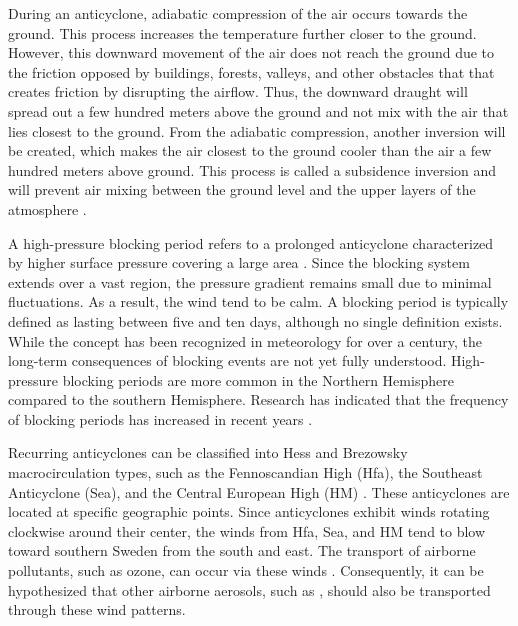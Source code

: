 During an anticyclone, adiabatic compression of the air occurs towards the ground. This process increases the temperature further closer to the ground. However, this downward movement of the air does not reach the ground due to the friction opposed by buildings, forests, valleys, and other obstacles that that creates friction by disrupting the airflow. Thus, the downward draught will spread out a few hundred meters above the ground and not mix with the air that lies closest to the ground. From the adiabatic compression, another inversion will be created, which makes the air closest to the ground cooler than the air a few hundred meters above ground. This process is called a subsidence inversion and will prevent air mixing between the ground level and the upper layers of the atmosphere \cite{gramschInfluenceSurfaceSubsidence2014}.

A high-pressure blocking period refers to a prolonged anticyclone characterized by higher surface pressure covering a large area \cite{lupoAtmosphericBlockingEvents2020}. Since the blocking system extends over a vast region, the pressure gradient remains small due to minimal fluctuations. As a result, the wind tend to be calm. A blocking period is typically defined as lasting between five and ten days, although no single definition exists. While the concept has been recognized in meteorology for over a century, the long-term consequences of blocking events are not yet fully understood. High-pressure blocking periods are more common in the Northern Hemisphere compared to the southern Hemisphere. Research has indicated that the frequency of blocking periods has increased in recent years \cite{lupoAtmosphericBlockingEvents2020}. 

Recurring anticyclones can be classified into Hess and Brezowsky macrocirculation types, such as the Fennoscandian High (Hfa), the Southeast Anticyclone (Sea), and the Central European High (HM) \cite{bartholyEuropeanCycloneTrack2006}. These anticyclones are located at specific geographic points. Since anticyclones exhibit winds rotating clockwise around their center, the winds from Hfa, Sea, and HM tend to blow toward southern Sweden from the south and east. The transport of airborne pollutants, such as ozone, can occur via these winds \cite{oteroImpactAtmosphericBlocking2022}. Consequently, it can be hypothesized that other airborne aerosols, such as \PM, should also be transported through these wind patterns.

